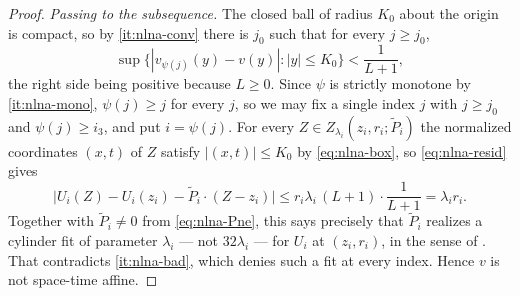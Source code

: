 \begin{proof}
\emph{Passing to the subsequence.} The closed ball of radius $K_0$ about the
origin is compact, so by \ref{it:nlna-conv} there is $j_0$ such that for every
$j\ge j_0$,
\[
  \sup\bigl\{|v_{\psi(j)}(y)-v(y)|:|y|\le K_0\bigr\}<\frac1{L+1},
\]
the right side being positive because $L\ge0$. Since $\psi$ is strictly
monotone by \ref{it:nlna-mono}, $\psi(j)\ge j$ for every $j$, so we may fix a
single index $j$ with $j\ge j_0$ and $\psi(j)\ge i_3$, and put
$i=\psi(j)$. For every $Z\in Z_{\lambda_i}(z_i,r_i;\widetilde P_i)$ the
normalized coordinates $(x,t)$ of $Z$ satisfy $|(x,t)|\le K_0$ by
\eqref{eq:nlna-box}, so \eqref{eq:nlna-resid} gives
\[
  \bigl|U_i(Z)-U_i(z_i)-\widetilde P_i\cdot(Z-z_i)\bigr|
   \le r_i\lambda_i\,(L+1)\cdot\frac1{L+1}=\lambda_ir_i .
\]
Together with $\widetilde P_i\ne0$ from \eqref{eq:nlna-Pne}, this says precisely
that $\widetilde P_i$ realizes a cylinder fit of parameter $\lambda_i$ --- not
$32\lambda_i$ --- for $U_i$ at $(z_i,r_i)$, in the sense of
. That contradicts \ref{it:nlna-bad}, which denies such a
fit at every index. Hence $v$ is not space-time affine.
\end{proof}
